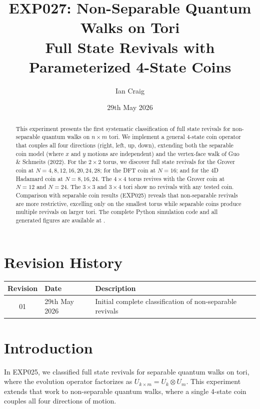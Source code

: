 \documentclass[12pt]{article}
\title{EXP027: Non-Separable Quantum Walks on Tori \\ 
       \large Full State Revivals with Parameterized 4-State Coins}
\author{Ian Craig}
\date{29th May 2026}
\begin{document}
\maketitle

\begin{abstract}
This experiment presents the first systematic classification of full state revivals for non-separable quantum walks on $n \times m$ tori. We implement a general 4-state coin operator that couples all four directions (right, left, up, down), extending both the separable coin model (where $x$ and $y$ motions are independent) and the vertex-face walk of Guo \& Schmeits (2022). For the $2 \times 2$ torus, we discover full state revivals for the Grover coin at $N = 4, 8, 12, 16, 20, 24, 28$; for the DFT coin at $N = 16$; and for the 4D Hadamard coin at $N = 8, 16, 24$. The $4 \times 4$ torus revives with the Grover coin at $N = 12$ and $N = 24$. The $3 \times 3$ and $3 \times 4$ tori show no revivals with any tested coin. Comparison with separable coin results (EXP025) reveals that non-separable revivals are more restrictive, excelling only on the smallest torus while separable coins produce multiple revivals on larger tori. The complete Python simulation code and all generated figures are available at \cite{exp027}.
\end{abstract}

\section*{Revision History}

\begin{table}[h!]
\centering
\begin{tabular}{cll}
\toprule
\textbf{Revision} & \textbf{Date} & \textbf{Description} \\
\midrule
01 & 29th May 2026 & Initial complete classification of non-separable revivals \\
\bottomrule
\end{tabular}
\end{table}

\section{Introduction}

In EXP025, we classified full state revivals for separable quantum walks on tori, where the evolution operator factorizes as $U_{k \times m} = U_k \otimes U_m$. This experiment extends that work to non-separable quantum walks, where a single 4-state coin couples all four directions of motion.
\end{document}
